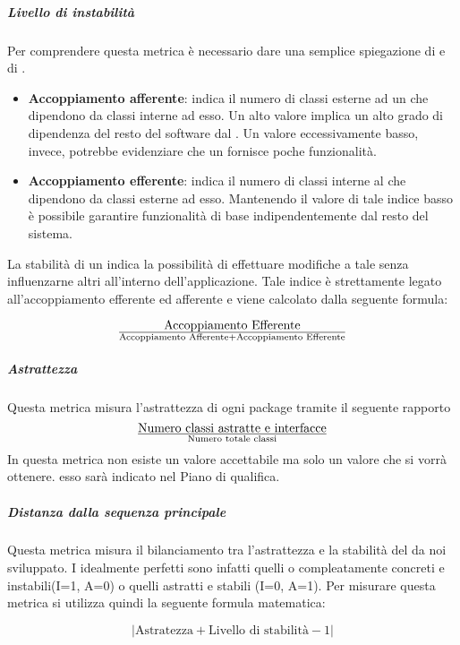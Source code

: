 \subparagraph{Livello di instabilità}
Per comprendere questa metrica è necessario dare una semplice spiegazione di  e di .
\begin{itemize}
\item
\textbf{Accoppiamento afferente}: indica il numero di classi esterne ad un  che dipendono da classi interne ad esso.
Un alto valore implica un alto grado di dipendenza del resto del software dal . Un valore eccessivamente basso, invece, potrebbe evidenziare che un  fornisce poche funzionalità.
\item
\textbf{Accoppiamento efferente}: indica il numero di classi interne al  che dipendono da classi esterne ad esso.
Mantenendo il valore di tale indice basso è possibile garantire funzionalità di base indipendentemente dal resto del sistema.
\end{itemize}

La stabilità di un  indica la possibilità di effettuare modifiche a tale  senza influenzarne altri all'interno dell'applicazione. Tale indice è strettamente legato all'accoppiamento efferente ed afferente e viene calcolato dalla seguente formula:

\begin{displaymath}
{\text{Accoppiamento Efferente}}\over{\text{Accoppiamento Afferente} + \text{Accoppiamento Efferente}}
\end{displaymath}

\subparagraph{Astrattezza}
Questa metrica misura l'astrattezza di ogni package tramite il seguente rapporto 
\begin{displaymath}
{\text{Numero classi astratte e interfacce}}\over{\text{Numero totale classi}}
\end{displaymath}
In questa metrica non esiste un valore accettabile ma solo un valore che si vorrà ottenere. esso sarà indicato nel Piano di qualifica.

\subparagraph{Distanza dalla sequenza principale}
Questa metrica misura il bilanciamento tra l'astrattezza e la stabilità del  da noi sviluppato. I  idealmente perfetti sono infatti quelli o compleatamente concreti e instabili(I=1, A=0) o quelli astratti e stabili (I=0, A=1). Per misurare questa metrica si utilizza quindi la seguente formula matematica:

\begin{displaymath}
{|\text{Astratezza} + \text{Livello di stabilità} - 1|}
\end{displaymath}

